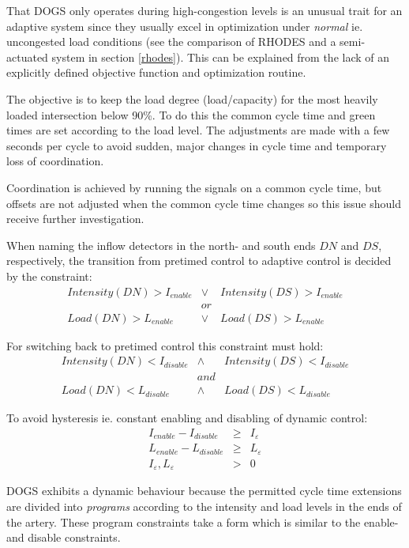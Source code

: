 That DOGS only operates during high-congestion levels is an unusual trait for an adaptive system since they usually excel in optimization under \textit{normal} ie. uncongested load conditions (see the comparison of RHODES and a semi-actuated system in section \ref{rhodes}). This can be explained from the lack of an explicitly defined objective function and optimization routine.

The objective is to keep the load degree (load/capacity) for the most heavily loaded intersection below 90\%.
To do this the common cycle time and green times are set according to the load level. The adjustments are made with a few seconds per cycle to avoid sudden, major changes in cycle time and temporary loss of coordination.

Coordination is achieved by running the signals on a common cycle time, but offsets are not adjusted when the common cycle time changes so this issue should receive further investigation.

When naming the inflow detectors in the north- and south ends $DN$ and $DS$, respectively, the transition from pretimed control to adaptive control is decided by the constraint:
\begin{eqnarray*}
Intensity(DN) > I_{enable} & \vee & Intensity(DS) > I_{enable} \\
& or & \\
Load(DN) > L_{enable} & \vee & Load(DS) > L_{enable}
\end{eqnarray*}

For switching back to pretimed control this constraint must hold:
\begin{eqnarray*}
Intensity(DN) < I_{disable} & \wedge & Intensity(DS) < I_{disable} \\
& and & \\
Load(DN) < L_{disable} & \wedge & Load(DS) < L_{disable}
\end{eqnarray*}

To avoid hysteresis ie. constant enabling and disabling of dynamic control:
\begin{eqnarray}
I_{enable} - I_{disable} & \geq & I_{\varepsilon} \label{eqn:hysteresis_intensity} \\ 
L_{enable} - L_{disable} & \geq & L_{\varepsilon} \label{eqn:hysteresis_load} \\
I_{\varepsilon},L_{\varepsilon} & > & 0 \label{eqn:hysteresis_limits}
\label{eqn:hysteresis}
\end{eqnarray}

DOGS exhibits a dynamic behaviour because the permitted cycle time extensions are divided into \textit{programs} according to the intensity and load levels in the ends of the artery. These program constraints take a form which is similar to the enable- and disable constraints.

